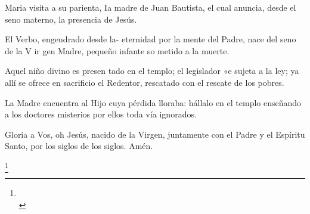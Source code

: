 Maria visita a su parienta, Ia madre de Juan Bautista, el cual anuncia, desde el seno materno, la presencia de Jesús.

El Verbo, engendrado desde la- eternidad por la mente del Padre, nace del seno de la V ir ­gen Madre, pequeño infante so­ metido a la muerte.

Aquel niño divino es presen­ tado en el templo; el legislador «e sujeta a la ley; ya allí se ofrece en sacrificio el Redentor, 
rescatado con el rescate de los pobres.

La Madre encuentra al Hijo cuya pérdida lloraba: hállalo en el templo enseñando a los doctores misterios por ellos toda­ vía ignorados.

Gloria a Vos, oh Jesús, naci­do de la Virgen, juntamente con el Padre y el Espíritu Santo, por los siglos de los siglos. Amén.

\vspace{0.5em}

\begin{otherlanguage}{latin}
      

      \vspace{0.25em}

      \footnote{ \\[0.5em] \indent}

      \vspace{0.25em}

      
\end{otherlanguage}